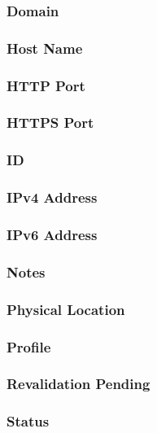 \subsubsection{Domain}

\subsubsection{Host Name}

\subsubsection{HTTP Port}

\subsubsection{HTTPS Port}

\subsubsection{ID}

\subsubsection{IPv4 Address}

\subsubsection{IPv6 Address}

\subsubsection{Notes}

\subsubsection{Physical Location}

\subsubsection{Profile}

\subsubsection{Revalidation Pending}

\subsubsection{Status}


